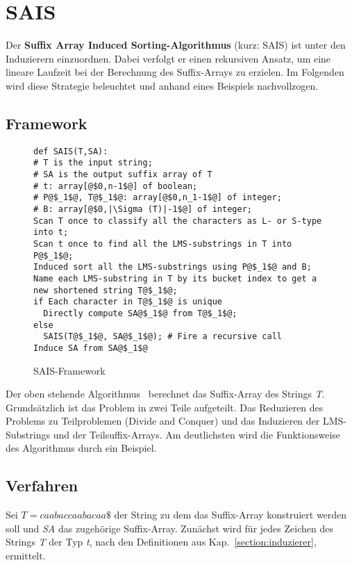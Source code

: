 \section{SAIS}


Der \textbf{Suffix Array Induced Sorting-Algorithmus}\cite[Kap.~4]{saca:6} (kurz: SAIS) ist unter den Induzierern einzuordnen. Dabei verfolgt er einen rekursiven Ansatz, um eine lineare Laufzeit bei der Berechnung des Suffix-Arrays zu erzielen. Im Folgenden wird diese Strategie beleuchtet und anhand eines Beispiels nachvollzogen.

\subsection{Framework}
\label{saisAlg}


\begin{figure}[h]
\begin{verbatim}
def SAIS(T,SA):
# T is the input string;
# SA is the output suffix array of T
# t: array[@$0,n-1$@] of boolean;
# P@$_1$@, T@$_1$@: array[@$0,n_1-1$@] of integer;
# B: array[@$0,|\Sigma (T)|-1$@] of integer;
Scan T once to classify all the characters as L- or S-type into t;
Scan t once to find all the LMS-substrings in T into P@$_1$@;
Induced sort all the LMS-substrings using P@$_1$@ and B;
Name each LMS-substring in T by its bucket index to get a new shortened string T@$_1$@;
if Each character in T@$_1$@ is unique
  Directly compute SA@$_1$@ from T@$_1$@;
else
  SAIS(T@$_1$@, SA@$_1$@); # Fire a recursive call
Induce SA from SA@$_1$@ 
\end{verbatim}
\caption{SAIS-Framework}
\end{figure}


\noindent Der oben stehende Algorithmus~\cite[Fig.~1]{saca:6} berechnet das Suffix-Array des Strings \textit{T}. Grundsätzlich ist das Problem in zwei Teile aufgeteilt. Das Reduzieren des Problems zu Teilproblemen (Divide and Conquer) und das Induzieren der LMS-Substrings und der Teilsuffix-Arrays. Am deutlichsten wird die Funktionsweise des Algorithmus durch ein Beispiel.

\subsection{Verfahren}
Sei $T=caabaccaabacaa\$$ der String zu dem das Suffix-Array konstruiert werden soll und \textit{SA} das zugehörige Suffix-Array. Zunächst wird für jedes Zeichen des Strings \textit{T} der Typ \textit{t}, nach den Definitionen aus Kap.~\ref{section:induzierer}, ermittelt.

